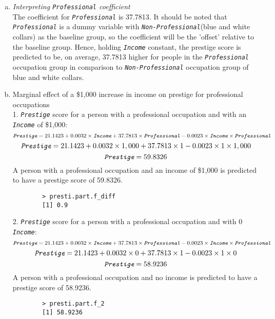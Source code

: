 \documentclass[12pt,letterpaper]{article}
\begin{document}
\begin{enumerate}[(a)]
		\item \textit{Interpreting \textit{\texttt{Professional}} coefficient}\\
		The coefficient for \textit{\texttt{Professional}} is 37.7813. It should be noted that \textit{\texttt{Professional}} is a dummy variable with \textit{\texttt{Non-Professional}}(blue and white collars) as the baseline group, so the coefficient will be the 'offset' relative to the baseline group. Hence, holding \textit{\texttt{Income}} constant, the prestige score is predicted to be, on average, 37.7813 higher for people in the \textit{\texttt{Professional}} occupation group in comparison to \textit{\texttt{Non-Professional}} occupation group of blue and white collars.
		
		\item Marginal effect of a \$1,000 increase in income on prestige for professional occupations \\
		1. \textit{\texttt{Prestige}} score for a person with a professional occupation and with an \textit{\texttt{Income}} of \$1,000:
		$$\textit{\texttt{Prestige}} = 21.1423 + 0.0032 \times \textit{\texttt{Income}} + 37.7813 \times \textit{\texttt{Professional}} - 0.0023 \times \textit{\texttt{Income}} \times \textit{\texttt{Professional}}$$
		$$ \textit{\texttt{Prestige}} = 21.1423 + 0.0032 \times 1,000 + 37.7813 \times 1 - 0.0023 \times 1 \times 1,000 $$
		$$ \textit{\texttt{Prestige}} =  59.8326 $$
		A person with a professional occupation and an income of \$1,000 is predicted to have a prestige score of 59.8326.\\
		
		\begin{verbatim}
		> presti.part.f_diff
		[1] 0.9
		\end{verbatim}
		
		2. \textit{\texttt{Prestige}} score for a person with a professional occupation and with 0 \textit{\texttt{Income}}:
		$$\textit{\texttt{Prestige}} = 21.1423 + 0.0032 \times \textit{\texttt{Income}} + 37.7813 \times \textit{\texttt{Professional}} - 0.0023 \times \textit{\texttt{Income}} \times \textit{\texttt{Professional}}$$
		$$ \textit{\texttt{Prestige}} = 21.1423 + 0.0032 \times 0 + 37.7813 \times 1 - 0.0023 \times 1 \times 0 $$
		$$ \textit{\texttt{Prestige}} =  58.9236 $$
		A person with a professional occupation and no income is predicted to have a prestige score of 58.9236.\\
		
		\begin{verbatim}
		> presti.part.f_2
		[1] 58.9236
		\end{verbatim}
	

\end{enumerate}
\end{document}
